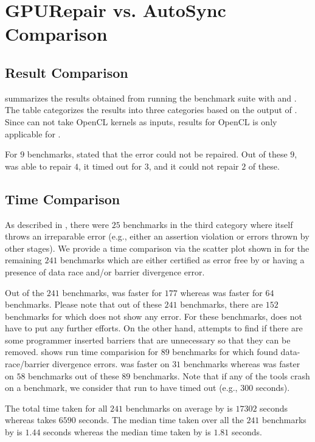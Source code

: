 \section{GPURepair vs. AutoSync Comparison}

\subsection{Result Comparison}
 summarizes the results obtained from running the benchmark suite with \tool and \autosync. The table categorizes the results into three categories based on the output of \verifier. Since \autosync can not take OpenCL kernels as inputs, results for OpenCL is only applicable for \tool.

For $9$ benchmarks, \autosync stated that the error could not be repaired. Out of these $9$, \tool was able to repair $4$, it timed out for $3$, and it could not repair $2$ of these.



\subsection{Time Comparison}
As described in , there were $25$ benchmarks in the third category where \verifier itself throws an irreparable error (e.g., either an assertion violation or errors thrown by other stages). We provide a time comparison via the scatter plot shown in  for the remaining $241$ benchmarks which are either certified as error free by \verifier or having a presence of data race and/or barrier divergence error.

Out of the $241$ benchmarks, \autosync was faster for $177$ whereas \tool was faster for $64$ benchmarks. Please note that out of these $241$ benchmarks, there are $152$ benchmarks for which \verifier does not show any error. For these benchmarks, \autosync does not have to put any further efforts. On the other hand, \tool attempts to find if there are some programmer inserted barriers that are unnecessary so that they can be removed.  shows run time comparision for $89$ benchmarks for which \verifier found data-race/barrier divergence errors. \autosync was faster on $31$ benchmarks whereas \tool was faster on $58$ benchmarks out of these $89$ benchmarks. Note that if any of the tools crash on a benchmark, we consider that run to have timed out (e.g., $300$ seconds).

The total time taken for all $241$ benchmarks on average by \autosync is $17302$ seconds whereas \tool takes $6590$ seconds. The median time taken over all the $241$ benchmarks by \autosync is $1.44$ seconds whereas the median time taken by \tool is $1.81$ seconds.

